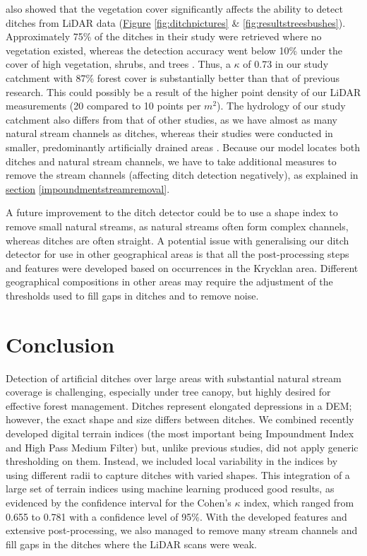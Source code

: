 \documentclass[11pt, review]{elsarticle} %
\begin{document}
\citet{bailly} also showed that the vegetation cover significantly affects the ability to detect ditches from LiDAR data (\hyperref[fig:ditchpictures]{Figure} \ref{fig:ditchpictures} \& \ref{fig:resultstreesbushes}). Approximately 75\% of the ditches in their study were retrieved where no vegetation existed, whereas the detection accuracy went below 10\% under the cover of high vegetation, shrubs, and trees \citep{bailly}. Thus, a $\kappa$ of 0.73 in our study catchment with 87\% forest cover \citep{krycklancatchment} is substantially better than that of previous research. This could possibly be a result of the higher point density of our LiDAR measurements (20 compared to 10 points per $m^{2}$). The hydrology of our study catchment also differs from that of other studies, as we have almost as many natural stream channels as ditches, whereas their studies were conducted in smaller, predominantly artificially drained areas \citep{bailly, roelens, rapinel}. Because our model locates both ditches and natural stream channels, we have to take additional measures to remove the stream channels (affecting ditch detection negatively), as explained in \hyperref[impoundmentstreamremoval]{section} \ref{impoundmentstreamremoval}.

A future improvement to the ditch detector could be to use a shape index to remove small natural streams, as natural streams often form complex channels, whereas ditches are often straight. A potential issue with generalising our ditch detector for use in other geographical areas is that all the post-processing steps and features were developed based on occurrences in the Krycklan area. Different geographical compositions in other areas may require the adjustment of the thresholds used to fill gaps in ditches and to remove noise.

\section{Conclusion}

Detection of artificial ditches over large areas with substantial natural stream coverage is challenging, especially under tree canopy, but highly desired for effective forest management. Ditches represent elongated depressions in a DEM; however, the exact shape and size differs between ditches. We combined recently developed digital terrain indices (the most important being Impoundment Index and High Pass Medium Filter) but, unlike previous studies, did not apply generic thresholding on them. Instead, we included local variability in the indices by using different radii to capture ditches with varied shapes. This integration of a large set of terrain indices using machine learning produced good results, as evidenced by the confidence interval for the Cohen's $\kappa$ index, which ranged from 0.655 to 0.781 with a confidence level of 95\%. With the developed features and extensive post-processing, we also managed to remove many stream channels and fill gaps in the ditches where the LiDAR scans were weak. 
\end{document}
